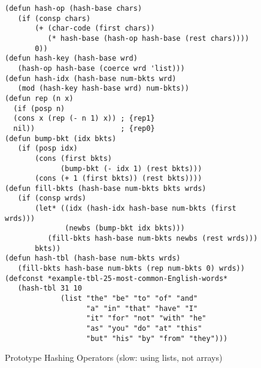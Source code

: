 \begin{figure}
\begin{center}
\begin{Verbatim}
(defun hash-op (hash-base chars)
   (if (consp chars)
       (+ (char-code (first chars))
          (* hash-base (hash-op hash-base (rest chars))))
       0))
(defun hash-key (hash-base wrd)
   (hash-op hash-base (coerce wrd 'list)))
(defun hash-idx (hash-base num-bkts wrd)
   (mod (hash-key hash-base wrd) num-bkts))
(defun rep (n x)
  (if (posp n)
  (cons x (rep (- n 1) x)) ; {rep1}
  nil))                    ; {rep0}
(defun bump-bkt (idx bkts)
   (if (posp idx)
       (cons (first bkts)
             (bump-bkt (- idx 1) (rest bkts)))
       (cons (+ 1 (first bkts)) (rest bkts))))
(defun fill-bkts (hash-base num-bkts bkts wrds)
   (if (consp wrds)
       (let* ((idx (hash-idx hash-base num-bkts (first wrds)))
              (newbs (bump-bkt idx bkts)))
          (fill-bkts hash-base num-bkts newbs (rest wrds)))
       bkts))
(defun hash-tbl (hash-base num-bkts wrds)
   (fill-bkts hash-base num-bkts (rep num-bkts 0) wrds))
(defconst *example-tbl-25-most-common-English-words*
   (hash-tbl 31 10
             (list "the" "be" "to" "of" "and"
                   "a" "in" "that" "have" "I"
                   "it" "for" "not" "with" "he"
                   "as" "you" "do" "at" "this"
                   "but" "his" "by" "from" "they")))
\end{Verbatim}
\caption{Prototype Hashing Operators (slow: using lists, not arrays)}
\label{fig:hash-defuns}
\end{center}
\end{figure}

